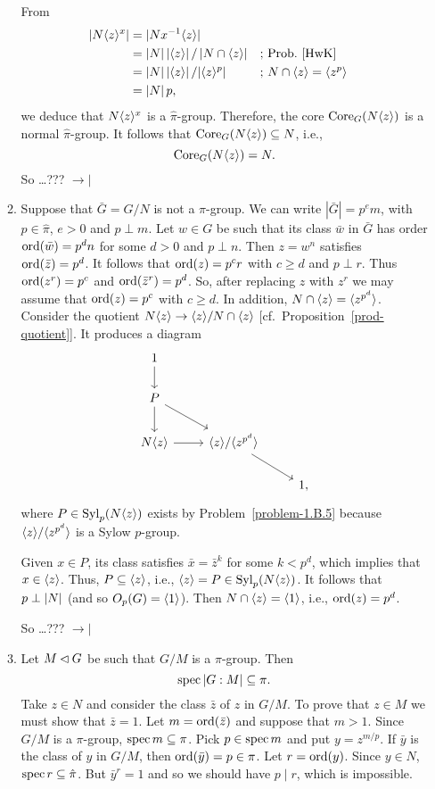 \begin{solution}
\begin{enumerate}[\rm a)]
\begin{enumerate}[$\to\!\!|$]
        From
        \begin{align*}
            |N\langle z\rangle^x| &=|Nx^{-1}\langle z\rangle|\\
                &=\left\vert{N}\right\vert\left\vert{\langle z\rangle}\right\vert/\left\vert{N\cap\langle z\rangle}\right\vert &&\textrm{; Prob.~\ref{HwK}}\\
                &=\left\vert{N}\right\vert\left\vert{\langle z\rangle}\right\vert/|\langle z\rangle^p| &&\textrm{; }N\cap\langle z\rangle=\langle z^p\rangle\\
                &=\left\vert{N}\right\vert p,
        \end{align*}
        we deduce that $N\langle z\rangle^x$ is a $\hat\pi$-group. Therefore, the core ${\rm Core}_G(N\langle z\rangle)$ is a normal $\hat\pi$-group. It follows that ${\rm Core}_G(N\langle z\rangle)\subseteq N$, i.e.,
        $$
            {\rm Core}_G(N\langle z\rangle)=N.
        $$
        So \dots??? $\to\!\!|$

        \item Suppose that $\bar G=G/N$ is not a $\pi$-group. We can write $|\bar G|=p^em$, with $p\in\hat\pi$, $e>0$ and $p\perp m$. Let $w\in G$ be such that its class $\bar w$ in $\bar G$ has order ${\rm ord}(\bar w)=p^dn$ for some $d>0$ and $p\perp n$. Then $z=w^n$ satisfies ${\rm ord}(\bar z)=p^d$. It follows that ${\rm ord}(z)=p^cr$ with $c\ge d$ and $p\perp r$. Thus ${\rm ord}(z^r)=p^c$ and ${\rm ord}(\bar z^r)=p^d$. So, after replacing $z$ with $z^r$ we may assume that ${\rm ord}(z)=p^c$ with $c\ge d$. In addition, $N\cap\langle z\rangle=\langle z^{p^d}\rangle$. Consider the quotient $N\langle z\rangle\to\langle z\rangle/N\cap\langle z\rangle$ [cf.~Proposition~\ref{prod-quotient}]. It produces a diagram
        $$
            \begin{tikzcd}
                1\arrow[d]\\
                P\arrow[rd]\arrow[d]\\
                N\gen z\arrow[r]&\gen z/\gen{z^{p^d}}\arrow[rd]\\
                &&1,
            \end{tikzcd}
        $$
        where $P\in{\rm Syl}_p(N\langle z\rangle)$ exists by Problem~\ref{problem-1.B.5} because $\langle z\rangle/\langle z^{p^d}\rangle$ is a Sylow $p$-group.
        
        Given $x\in P$, its class satisfies $\bar x=\bar z^k$ for some $k<p^d$, which implies that $x\in\langle z\rangle$. Thus, $P\subseteq\langle z\rangle$, i.e., $\langle z\rangle=P\in{\rm Syl}_p(N\langle z\rangle)$. It follows that $p\perp\left\vert{N}\right\vert$ (and so $O_p(G)=\langle1\rangle$). Then $N\cap\langle z\rangle=\langle1\rangle$, i.e., ${\rm ord}(z)=p^d$.
        
        
        So \dots??? $\to\!\!|$
        
        \item[\checkmark] Let $M\lhd G$ be such that $G/M$ is a $\pi$-group. Then
        $$
            \operatorname{spec}\left\vert{G:M}\right\vert\subseteq\pi.
        $$
        Take $z\in N$ and consider the class $\bar z$ of $z$ in $G/M$. To prove that $z\in M$ we must show that $\bar z=1$. Let $m={\rm ord}(\bar z)$ and suppose that $m>1$. Since $G/M$ is a $\pi$-group, $\operatorname{spec}m\subseteq\pi$. Pick $p\in\operatorname{spec}m$ and put $y=z^{m/p}$. If $\bar y$ is the class of $y$ in $G/M$, then ${\rm ord}(\bar y) = p\in\pi$. Let $r={\rm ord}(y)$. Since $y\in N$, $\operatorname{spec}r\subseteq\hat\pi$. But $\bar y^r=1$ and so we should have $p\mid r$, which is impossible.
        

\end{enumerate}
\end{enumerate}
\end{solution}
